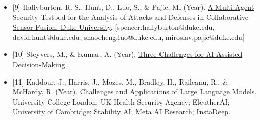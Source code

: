 \begin{itemize}
{  Language Models are Scalable Judges}. Beijing Academy of Artificial
  Intelligence; School of EIC, Huazhong University of Science \&
  Technology. \href{https://github.com/baaivision/JudgeLM}{repo}
\item
  {[}9{]} Hallyburton, R. S., Hunt, D., Luo, S., \& Pajic, M. (Year).
  \href{https://arxiv.org/pdf/2401.09387.pdf}{A Multi-Agent Security
  Testbed for the Analysis of Attacks and Defenses in Collaborative
  Sensor Fusion. Duke University}. {[}spencer.hallyburton@duke.edu,
  david.hunt@duke.edu, shaocheng.luo@duke.edu,
  miroslav.pajic@duke.edu{]}
\item
  {[}10{]} Steyvers, M., \& Kumar, A. (Year).
  \href{https://journals.sagepub.com/doi/full/10.1177/17456916231181102}{Three
  Challenges for AI-Assisted Decision-Making}.
\item
  {[}11{]} Kaddour, J., Harris, J., Mozes, M., Bradley, H., Raileanu,
  R., \& McHardy, R. (Year).
  \href{https://arxiv.org/pdf/2307.10169.pdf}{Challenges and
  Applications of Large Language Models}. University College London; UK
  Health Security Agency; EleutherAI; University of Cambridge; Stability
  AI; Meta AI Research; InstaDeep.
\end{itemize}
